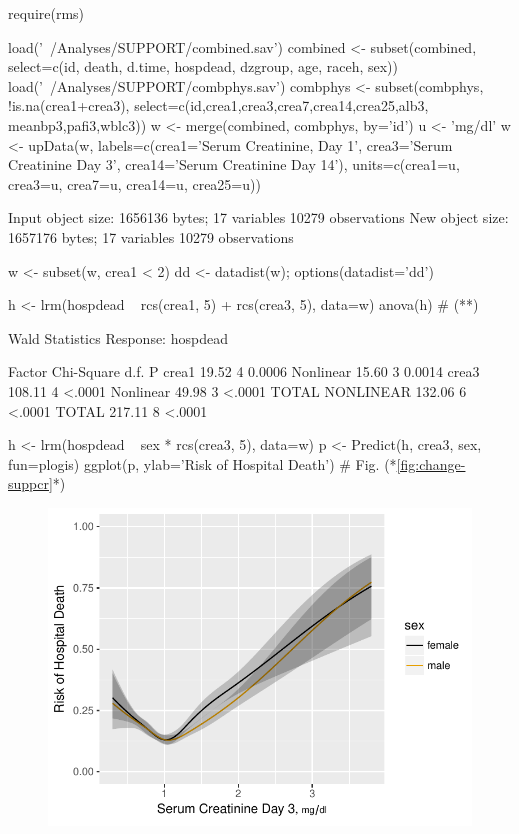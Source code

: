 \begin{Schunk}
\begin{Sinput}
require(rms)
\end{Sinput}
\begin{Sinput}
load('~/Analyses/SUPPORT/combined.sav')
combined <- subset(combined,
  select=c(id, death, d.time, hospdead, dzgroup, age, raceh, sex))
load('~/Analyses/SUPPORT/combphys.sav')
combphys <- subset(combphys, !is.na(crea1+crea3),
                   select=c(id,crea1,crea3,crea7,crea14,crea25,alb3,
                     meanbp3,pafi3,wblc3))
w <- merge(combined, combphys, by='id')
u <- 'mg/dl'
w <- upData(w, labels=c(crea1='Serum Creatinine, Day 1',
                 crea3='Serum Creatinine Day 3',
                 crea14='Serum Creatinine Day 14'),
            units=c(crea1=u, crea3=u, crea7=u, crea14=u, crea25=u))
\end{Sinput}
\begin{Soutput}
Input object size:	 1656136 bytes;	 17 variables	 10279 observations
New object size:	1657176 bytes;	17 variables	10279 observations
\end{Soutput}
\begin{Sinput}
w <- subset(w, crea1 < 2)
dd <- datadist(w); options(datadist='dd')

h <- lrm(hospdead ~ rcs(crea1, 5) + rcs(crea3, 5), data=w)
anova(h)   # (**)
\end{Sinput}
\begin{Soutput}
                Wald Statistics          Response: hospdead 

 Factor          Chi-Square d.f. P     
 crea1            19.52     4    0.0006
  Nonlinear       15.60     3    0.0014
 crea3           108.11     4    <.0001
  Nonlinear       49.98     3    <.0001
 TOTAL NONLINEAR 132.06     6    <.0001
 TOTAL           217.11     8    <.0001
\end{Soutput}
\begin{Sinput}
h <- lrm(hospdead ~ sex * rcs(crea3, 5), data=w)
p <- Predict(h, crea3, sex, fun=plogis)
ggplot(p, ylab='Risk of Hospital Death')    # Fig. (*\ref{fig:change-suppcr}*)
\end{Sinput}
\begin{figure}[htbp]

\centerline{\includegraphics[width=\maxwidth]{change-suppcr-1} }


\end{figure}
\end{Schunk}

